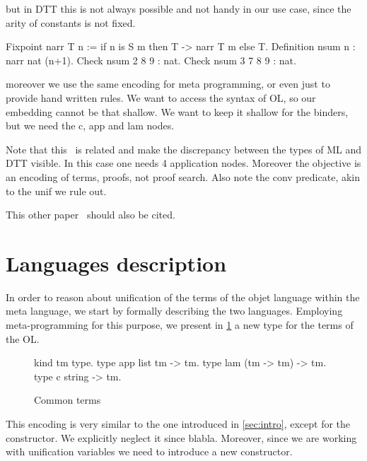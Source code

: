 \documentclass[sigconf,natbib=false]{acmart}
\begin{document}
but in DTT this is not always possible and not handy in our use case,
since the arity of constants is not fixed.

\begin{coqcode}
Fixpoint narr T n := 
  if n is S m then T -> narr T m else T.
Definition nsum n : narr nat (n+1).
Check nsum 2   8 9 : nat.
Check nsum 3 7 8 9 : nat.
\end{coqcode}
  
moreover we use the same encoding for meta programming, or even just to provide
hand written rules. We want to access the syntax of OL, so our embedding cannot
be that shallow. We want to keep it shallow for the binders, but we need
the c, app and lam nodes. %


Note that this~\cite{felty93lics} is related and make the
discrepancy between the types of ML and DTT visible. In this case
one needs 4 application nodes. Moreover the objective is an encoding
of terms, proofs, not proof search. Also note the conv predicate,
akin to the unif we rule out.

This other paper~\cite{10.1007/978-3-031-38499-8_25} should also be cited.

\section{Languages description}
\label{sec:lang-spec}




\def\eqfo{eq\_fo\xspace}

In order to reason about unification of the terms of the objet language within the
meta language, we start by formally describing the two languages. Employing
meta-programming for this purpose, we present in \cref{code:common-terms} a new type for the terms of
the OL.
%
\setlength{\abovecaptionskip}{0pt}
\setlength{\belowcaptionskip}{-13pt}

\begin{figure}[H]
  \begin{elpicode}
    kind tm type.
    type app list tm -> tm.
    type lam (tm -> tm) -> tm.
    type c   string -> tm.
  \end{elpicode}
  \caption{Common terms}
  \label{code:common-terms}
\end{figure}
%
\noindent
This encoding is very similar to the one introduced in \cref{sec:intro}, except
for the  constructor. We explicitly neglect it since blabla.
Moreover, since we are working with unification variables we need to introduce a
new constructor. 
\end{document}
